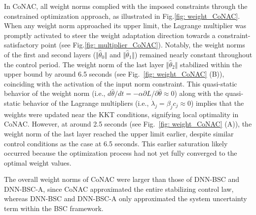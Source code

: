 \documentclass[lettersize,journal]{IEEEtran}
\begin{document}
In CoNAC, all weight norms complied with the imposed constraints through the constrained optimization approach, as illustrated in Fig.\ref{fig: weight_CoNAC}. When any weight norm approached its upper limit, the Lagrange multiplier was promptly activated to steer the weight adaptation direction towards a constraint-satisfactory point (see Fig.\ref{fig: multiplier_CoNAC}). Notably, the weight norms of the first and second layers ($\Vert {{{\hat \theta }_0}} \Vert$ and $\Vert {{{\hat \theta }_1}} \Vert$) remained nearly constant throughout the control period. The weight norm of the last layer $\Vert {{{\hat \theta }_2}} \Vert$ stabilized within the upper bound by around 6.5 seconds (see Fig.~\ref{fig: weight_CoNAC} (B)), coinciding with the activation of the input norm constraint. This quasi-static behavior of the weight norm (i.e., $d{\hat\theta}/dt=-\alpha\partial L/\partial \hat\theta \approx 0$) along with the quasi-static behavior of the Lagrange multipliers (i.e., $\dot\lambda_j = \beta_j c_j \approx 0$) implies that the weights were updated near the KKT conditions, signifying local optimality in CoNAC. However, at around 2.5 seconds (see Fig.~\ref{fig: weight_CoNAC} (A)), the weight norm of the last layer reached the upper limit earlier, despite similar control conditions as the case at 6.5 seconds. This earlier saturation likely occurred because the optimization process had not yet fully converged to the optimal weight values.

The overall weight norms of CoNAC were larger than those of DNN-BSC and DNN-BSC-A, since CoNAC approximated the entire stabilizing control law, whereas DNN-BSC and DNN-BSC-A only approximated the system uncertainty term within the BSC framework.



\end{document}

